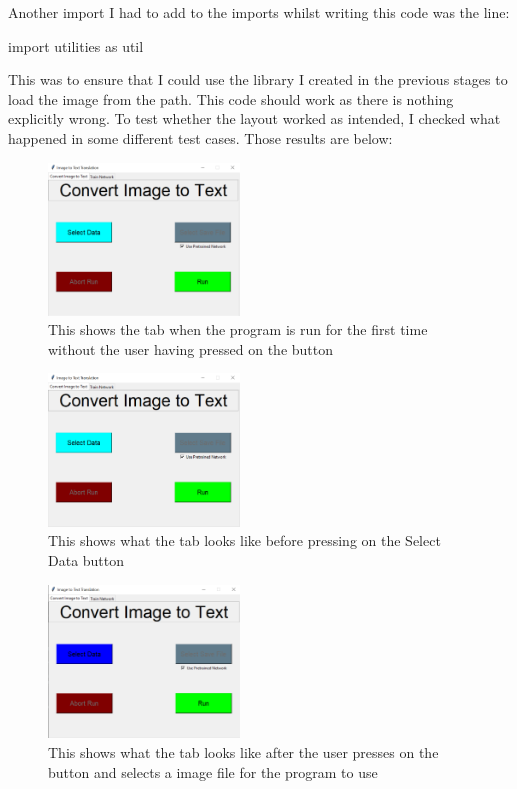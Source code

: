 \documentclass{report}
\begin{document}
Another import I had to add to the imports whilst writing this code was the line:
\begin{python}
import utilities as util
\end{python}
This was to ensure that I could use the library I created in the previous stages to load the image from the path. This code should work as there is nothing explicitly wrong. To test whether the layout worked as intended, I checked what happened in some different test cases. Those results are below:
\begin{figure}[H]
    \centering
    \includegraphics[width=2in]{Images/Development and Testing/Stage 7/Image to Text Conversion Tab/Tests for Select Data Function/Before selecting input.png}
    \caption{This shows the tab when the program is run for the first time without the user having pressed on the button}
\end{figure}
\begin{figure}[H]
    \centering
    \includegraphics[width=2in]{Images/Development and Testing/Stage 7/Image to Text Conversion Tab/Tests for Select Data Function/After Opening the File Explorer and closing it without selecting any input.png}
    \caption{This shows what the tab looks like before pressing on the Select Data button}
\end{figure}
\begin{figure}[H]
    \centering
    \includegraphics[width=2in]{Images/Development and Testing/Stage 7/Image to Text Conversion Tab/Tests for Select Data Function/After Opening the File Explorer and closing it after selecting an input.png}
    \caption{This shows what the tab looks like after the user presses on the button and selects a image file for the program to use}
\end{figure}
\end{document}
